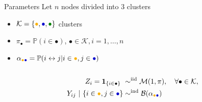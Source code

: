 \documentclass[compress,10pt]{beamer}
\begin{document}
\begin{frame}
\begin{center}
\begin{overlayarea}{\textwidth}{.5\textheight}
\begin{columns}
        \begin{column}{.5\paperwidth}
          \begin{small}
            \begin{block}{Parameters}
              Let $n$ nodes divided into $3$ clusters
              \begin{itemize}
              \item
                $\mathcal{K}=\{\textcolor{yellow!40!orange}{\bullet},\textcolor{blue!80!black}{\bullet},\textcolor{green!50!black}{\bullet}\}$
                 clusters
              \item  $\pi_\bullet  =  \mathbb{P}(i  \in  \bullet)$,
                $\bullet\in\mathcal{K},i=1,\dots,n$
              \item      $\alpha_{\textcolor{yellow!40!orange}{\bullet}\textcolor{blue!80!black}{\bullet}}     =      \mathbb{P}(i
                \leftrightarrow j | i\in\textcolor{yellow!40!orange}{\bullet},j\in\textcolor{blue!80!black}{\bullet})$
              \end{itemize}
            \end{block}
          \end{small}
        \end{column}
      \end{columns}
    \end{overlayarea}
  \end{center}
  

\begin{align*}
Z_i = \mathbf{1}_{\{i \in \bullet\}}  \ & \sim^{\text{iid}} \mathcal{M}(1,\pi), \quad \forall\bullet \in \mathcal{K}, \\ 
Y_{ij} \ | \ \{i\in\textcolor{yellow!40!orange}{\bullet},j\in\textcolor{blue!80!black}{\bullet}\}
& \sim^{\text{ind}} \mathcal{B}(\alpha_{\textcolor{yellow!40!orange}{\bullet}\textcolor{blue!80!black}{\bullet}})\\
\end{align*}

\end{frame}


\end{document}
